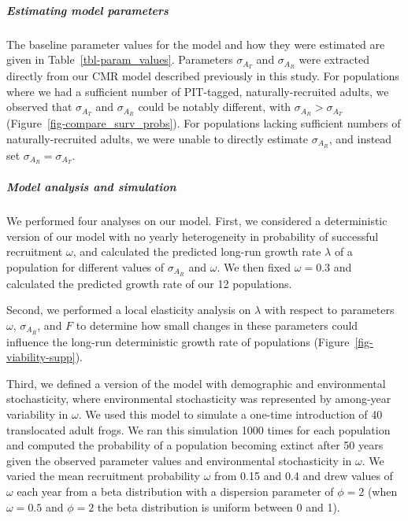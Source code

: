 \documentclass[9pt,twoside,lineno]{pnas-new}
\begin{document}
\hypertarget{estimating-model-parameters}{%
\subparagraph{Estimating model
parameters}\label{estimating-model-parameters}}

The baseline parameter values for the model and how they were estimated
are given in Table~\ref{tbl-param_values}. Parameters \(\sigma_{A_T}\)
and \(\sigma_{A_R}\) were extracted directly from our CMR model
described previously in this study. For populations where we had a
sufficient number of PIT-tagged, naturally-recruited adults, we observed
that \(\sigma_{A_T}\) and \(\sigma_{A_R}\) could be notably different,
with \(\sigma_{A_R} > \sigma_{A_T}\)
(Figure~\ref{fig-compare_surv_probs}). For populations lacking
sufficient numbers of naturally-recruited adults, we were unable to
directly estimate \(\sigma_{A_R}\), and instead set
\(\sigma_{A_R} = \sigma_{A_T}\).

\hypertarget{model-analysis-and-simulation}{%
\subparagraph{Model analysis and
simulation}\label{model-analysis-and-simulation}}

We performed four analyses on our model. First, we considered a
deterministic version of our model with no yearly heterogeneity in
probability of successful recruitment \(\omega\), and calculated the
predicted long-run growth rate \(\lambda\) of a population for different
values of \(\sigma_{A_R}\) and \(\omega\). We then fixed
\(\omega = 0.3\) and calculated the predicted growth rate of our 12
populations.

Second, we performed a local elasticity analysis on \(\lambda\) with
respect to parameters \(\omega\), \(\sigma_{A_R}\), and \(F\) to
determine how small changes in these parameters could influence the
long-run deterministic growth rate of populations
(Figure~\ref{fig-viability-supp}).

Third, we defined a version of the model with demographic and
environmental stochasticity, where environmental stochasticity was
represented by among-year variability in \(\omega\). We used this model
to simulate a one-time introduction of 40 translocated adult frogs. We
ran this simulation 1000 times for each population and computed the
probability of a population becoming extinct after 50 years given the
observed parameter values and environmental stochasticity in \(\omega\).
We varied the mean recruitment probability \(\omega\) from 0.15 and 0.4
and drew values of \(\omega\) each year from a beta distribution with a
dispersion parameter of \(\phi = 2\) (when \(\omega = 0.5\) and
\(\phi = 2\) the beta distribution is uniform between 0 and 1).
\end{document}
